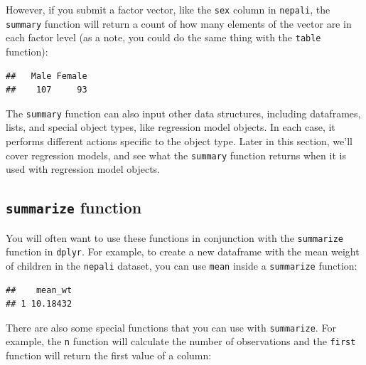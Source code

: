 \documentclass[]{book}
\makeatletter
\newenvironment{Shaded}{\begin{snugshade}}{\end{snugshade}}
\newcommand{\KeywordTok}[1]{\textcolor[rgb]{0.13,0.29,0.53}{\textbf{#1}}}
\newcommand{\DataTypeTok}[1]{\textcolor[rgb]{0.13,0.29,0.53}{#1}}
\newcommand{\StringTok}[1]{\textcolor[rgb]{0.31,0.60,0.02}{#1}}
\newcommand{\OtherTok}[1]{\textcolor[rgb]{0.56,0.35,0.01}{#1}}
\newcommand{\OperatorTok}[1]{\textcolor[rgb]{0.81,0.36,0.00}{\textbf{#1}}}
\newcommand{\NormalTok}[1]{#1}
\newenvironment{kframe}{%
\medskip{}
\setlength{\fboxsep}{.8em}
 \def\at@end@of@kframe{}%
 \ifinner\ifhmode%
  \def\at@end@of@kframe{\end{minipage}}%
  \begin{minipage}{\columnwidth}%
 \fi\fi%
 \def\FrameCommand##1{\hskip\@totalleftmargin \hskip-\fboxsep
 \colorbox{shadecolor}{##1}\hskip-\fboxsep
     \hskip-\linewidth \hskip-\@totalleftmargin \hskip\columnwidth}%
 \MakeFramed {\advance\hsize-\width
   \@totalleftmargin\z@ \linewidth\hsize
   \@setminipage}}%
 {\par\unskip\endMakeFramed%
 \at@end@of@kframe}
\renewenvironment{Shaded}{\begin{kframe}}{\end{kframe}}
\theoremstyle{definition}
\theoremstyle{definition}
\theoremstyle{definition}
\theoremstyle{remark}
\makeatother
\begin{document}
However, if you submit a factor vector, like the \texttt{sex} column in
\texttt{nepali}, the \texttt{summary} function will return a count of
how many elements of the vector are in each factor level (as a note, you
could do the same thing with the \texttt{table} function):

\begin{Shaded}
\end{Shaded}

\begin{verbatim}
##   Male Female 
##    107     93
\end{verbatim}

The \texttt{summary} function can also input other data structures,
including dataframes, lists, and special object types, like regression
model objects. In each case, it performs different actions specific to
the object type. Later in this section, we'll cover regression models,
and see what the \texttt{summary} function returns when it is used with
regression model objects.

\subsection{\texorpdfstring{\texttt{summarize}
function}{summarize function}}\label{summarize-function}

You will often want to use these functions in conjunction with the
\texttt{summarize} function in \texttt{dplyr}. For example, to create a
new dataframe with the mean weight of children in the \texttt{nepali}
dataset, you can use \texttt{mean} inside a \texttt{summarize} function:

\begin{Shaded}
\end{Shaded}

\begin{verbatim}
##    mean_wt
## 1 10.18432
\end{verbatim}

There are also some special functions that you can use with
\texttt{summarize}. For example, the \texttt{n} function will calculate
the number of observations and the \texttt{first} function will return
the first value of a column:
\end{document}
